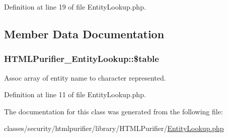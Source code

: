 Definition at line 19 of file Entity\+Lookup.\+php.



\subsection{Member Data Documentation}
\hypertarget{classHTMLPurifier__EntityLookup_a821c8d947878cf667426a6aa809d605c}{
\subsubsection[{\$table}]{\setlength{\rightskip}{0pt plus 5cm}H\+T\+M\+L\+Purifier\+\_\+\+Entity\+Lookup\+::\$table}}\label{classHTMLPurifier__EntityLookup_a821c8d947878cf667426a6aa809d605c}
Assoc array of entity name to character represented. 

Definition at line 11 of file Entity\+Lookup.\+php.



The documentation for this class was generated from the following file\+:\begin{DoxyCompactItemize}
\item 
classes/security/htmlpurifier/library/\+H\+T\+M\+L\+Purifier/\hyperlink{EntityLookup_8php}{Entity\+Lookup.\+php}\end{DoxyCompactItemize}
